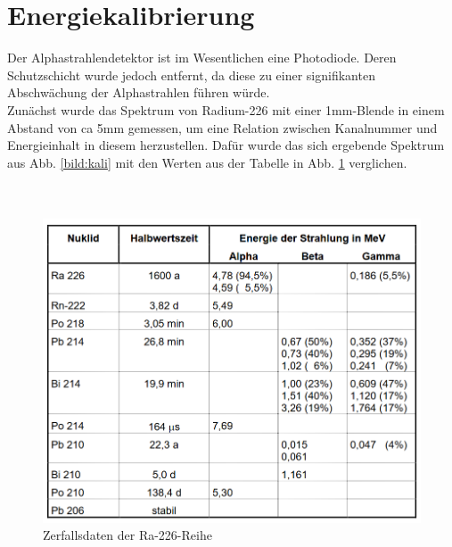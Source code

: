 


\section{Energiekalibrierung}
\label{subs:kali}

Der Alphastrahlendetektor ist im Wesentlichen eine Photodiode. Deren Schutzschicht wurde jedoch entfernt, da diese zu einer signifikanten 
Abschwächung der Alphastrahlen führen würde.\\
Zunächst wurde das Spektrum von Radium-226 mit einer 1mm-Blende in einem Abstand von ca 5mm gemessen, um eine Relation zwischen Kanalnummer 
und Energieinhalt in diesem herzustellen. Dafür wurde das sich ergebende Spektrum aus Abb. \ref{bild:kali} mit den Werten aus der 
Tabelle in Abb. \ref{bild:TabelleRa} verglichen.
\\
\\
\\

\begin{figure}[h]
    \centering
    \includegraphics[scale=0.5]{Bilder/TabelleRadium.png}
    \caption{Zerfallsdaten der Ra-226-Reihe \protect \footnotemark}
    \label{bild:TabelleRa}
\end{figure}

\clearpage

